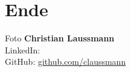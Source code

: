 
\section{Ende}

\begin{frame}{}
		Foto
		\textbf{Christian Laussmann}\\
		LinkedIn:\\
		GitHub: \href{https://github.com/claussmann}{\textcolor{secondarycolor}{github.com/claussmann}}
\end{frame}